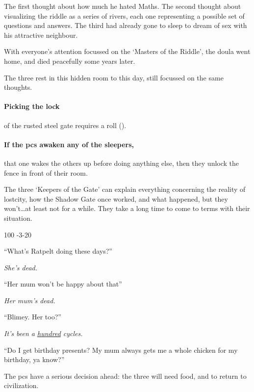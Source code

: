 \begin{multicols}{2}
\begin{exampletext}
  The first thought about how much he hated Maths.
  The second thought about visualizing the riddle as a series of rivers, each one representing a possible set of questions and answers.
  The third had already gone to sleep to dream of sex with his attractive neighbour.

  With everyone's attention focussed on the `Masters of the Riddle', the \gls{doula} went home, and died peacefully some years later.

  The three rest in this hidden room to this day, still focussed on the same thoughts.
\end{exampletext}

\paragraph{Picking the lock}
of the rusted steel gate requires a  roll (\tn[16]).

\paragraph{If the \glspl{pc} awaken any of the sleepers,}
that one wakes the others up before doing anything else, then they unlock the fence in front of their room.

The three `Keepers of the Gate' can explain everything concerning the reality of \gls{lostcity}, how the Shadow Gate once worked, and what happened, but they won't\ldots at least not for a while.
They take a long time to come to terms with their situation.



%
  {{1}{0}{0}}%
  {{-3}{-2}{0}}%
  {%
    \Dagger
  }%
  {}%
  {\lootSmall}%
  {}%

\null
\begin{speechtext}
  ``What's Ratpelt doing these days?''

  \textit{\raggedleft{} She's dead.}

  ``Her mum won't be happy about that''

  \textit{\raggedleft{} Her mum's dead.}

  ``Blimey. Her too?''

  \textit{\raggedleft{} It's been a \underline{hundred} \glspl{cycle}.}

  ``Do I get birthday presents?
  My mum always gets me a whole chicken for my birthday, ya know?''
\end{speechtext}

The \glspl{pc} have a serious decision ahead: the three will need food, and to return to civilization.

\end{multicols}


